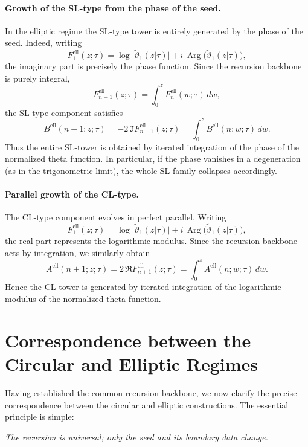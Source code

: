 \documentclass[11pt]{article}
\DeclareMathOperator{\Arg}{Arg}
\begin{document}
\paragraph{Growth of the SL-type from the phase of the seed.}
In the elliptic regime the SL-type tower is entirely generated by the phase
of the seed.
Indeed, writing
\[
F^{\mathrm{ell}}_1(z;\tau)
=
\log\bigl|\widetilde{\vartheta}_1(z|\tau)\bigr|
+
i\,\Arg\bigl(\widetilde{\vartheta}_1(z|\tau)\bigr),
\]
the imaginary part is precisely the phase function.
Since the recursion backbone is purely integral,
\[
F^{\mathrm{ell}}_{n+1}(z;\tau)
=
\int_{0}^{z} F^{\mathrm{ell}}_{n}(w;\tau)\,dw,
\]
the SL-type component satisfies
\[
B^{\mathrm{ell}}(n+1;z;\tau)
=
-2\,\Im F^{\mathrm{ell}}_{n+1}(z;\tau)
=
\int_{0}^{z} B^{\mathrm{ell}}(n;w;\tau)\,dw.
\]
Thus the entire SL-tower is obtained by iterated integration
of the phase of the normalized theta function.
In particular, if the phase vanishes in a degeneration
(as in the trigonometric limit),
the whole SL-family collapses accordingly.

\paragraph{Parallel growth of the CL-type.}
The CL-type component evolves in perfect parallel.
Writing
\[
F^{\mathrm{ell}}_1(z;\tau)
=
\log\bigl|\widetilde{\vartheta}_1(z|\tau)\bigr|
+
i\,\Arg\bigl(\widetilde{\vartheta}_1(z|\tau)\bigr),
\]
the real part represents the logarithmic modulus.
Since the recursion backbone acts by integration,
we similarly obtain
\[
A^{\mathrm{ell}}(n+1;z;\tau)
=
2\,\Re F^{\mathrm{ell}}_{n+1}(z;\tau)
=
\int_{0}^{z} A^{\mathrm{ell}}(n;w;\tau)\,dw.
\]
Hence the CL-tower is generated by iterated integration
of the logarithmic modulus of the normalized theta function.


\section{Correspondence between the Circular and Elliptic Regimes}

Having established the common recursion backbone, we now clarify the precise
correspondence between the circular and elliptic constructions.
The essential principle is simple:

\medskip
\emph{The recursion is universal; only the seed and its boundary data change.}
\medskip
\end{document}
